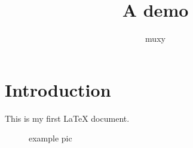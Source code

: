 \documentclass{article}
\begin{document}
\title{A demo}
\author{muxy} 

\maketitle 

\section{Introduction}
This is my first LaTeX document. 

\begin{figure}[h]
    \centering
    
    \caption{example pic}
    \label{fig:example}
\end{figure}
\end{document}
